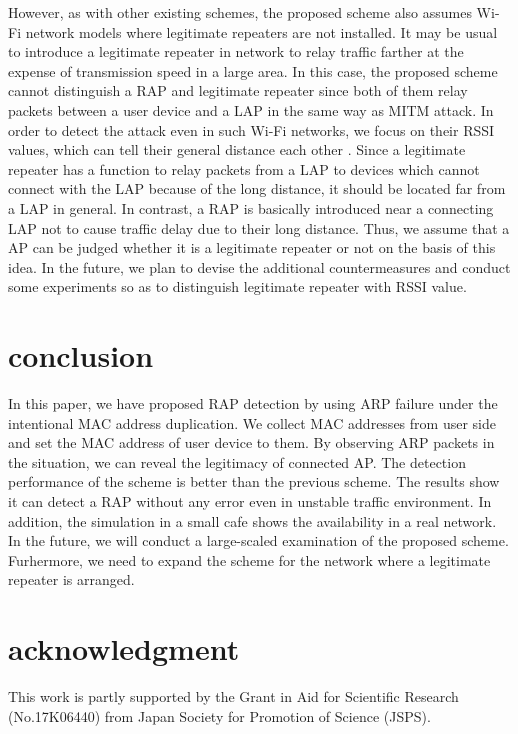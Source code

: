 \documentclass[conference]{IEEEtran}
\begin{document}
However, as with other existing schemes, the proposed scheme also assumes Wi-Fi network models where legitimate repeaters are not installed.
It may be usual to introduce a legitimate repeater in network to relay traffic farther at the expense of transmission speed in a large area.
In this case, the proposed scheme cannot distinguish a RAP and legitimate repeater since both of them relay packets between a user device and a LAP in the same way as MITM attack.
In order to detect the attack even in such Wi-Fi networks, we focus on their RSSI values, which can tell their general distance each other \cite{rssi}.
Since a legitimate repeater has a function to relay packets from a LAP to devices which cannot connect with the LAP because of the long distance, it should be located far from a LAP in general.
In contrast, a RAP is basically introduced near a connecting LAP not to cause traffic delay due to their long distance.
Thus, we assume that a AP can be judged whether it is a legitimate repeater or not on the basis of this idea.
In the future, we plan to devise the additional countermeasures and conduct some experiments so as to distinguish legitimate repeater with RSSI value.

\section{conclusion}\label{sec:6}
In this paper, we have proposed RAP detection by using ARP failure under the intentional MAC address duplication.
We collect MAC addresses from user side and set the MAC address of user device to them.
By observing ARP packets in the situation, we can reveal the legitimacy of connected AP.
The detection performance of the scheme is better than the previous scheme.
The results show it can detect a RAP without any error even in unstable traffic environment.
In addition, the simulation in a small cafe shows the availability in a real network.
In the future, we will conduct a large-scaled examination of the proposed scheme.
Furhermore, we need to expand the scheme for the network where a legitimate repeater is arranged.

\section*{acknowledgment}
This work is partly supported by the Grant in Aid for Scientific Research (No.17K06440) from Japan Society for Promotion of Science (JSPS).




\vspace{12pt}
\end{document}
